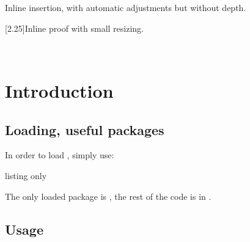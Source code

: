 \documentclass[11pt,a4paper]{ltxdoc}
\begin{document}
\begin{tcolorbox}[colframe=lightgray,colback=lightgray!5]
{Inline insertion,  with automatic adjustments but without depth.}
\end{tcolorbox}

\begin{tcolorbox}[colframe=lightgray,colback=lightgray!5]
\scalebox{2.25}[2.25]{Inline  proof with small resizing.}
\end{tcolorbox}

\begin{tcolorbox}[colframe=lightgray,colback=lightgray!5]
\end{tcolorbox}

\vfill~

\vspace*{5mm}

\pagebreak


\hypertarget{matoc}{}

\tableofcontents

\vspace*{5mm}


\pagebreak

\section{Introduction}

\subsection{Loading, useful packages}

In order to load , simply use:

\begin{DemoCode}{listing only}
\usepackage{inlinegraphicx}
\end{DemoCode}

The only loaded package is , the rest of the code is in .

\subsection{Usage}
\end{document}
